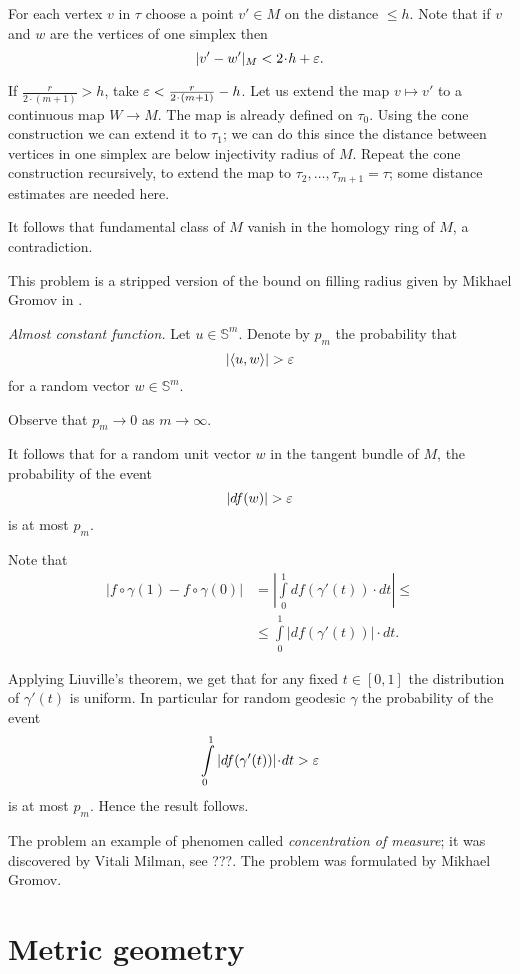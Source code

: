 For each vertex $v$ in $\tau$ 
choose a point $v'\in M$ on the distance $\le h$.
Note that if $v$ and $w$ are the vertices of one simplex then
\[|v'-w'|_M<2\cdot h+\eps.\]

If $\tfrac{r}{2\cdot(m+1)}>h$, take $\eps<\tfrac{r}{2\cdot(m+1)}-h$.
Let us extend the map $v\mapsto v'$ 
to a continuous 
map $W\to M$.
The map is already defined on $\tau_0$.
Using the cone construction we can extend it to $\tau_1$;
we can do this since the distance between vertices in one simplex are below injectivity radius of $M$.
Repeat the cone construction recursively, to extend the map to $\tau_2,\dots,\tau_{m+1}=\tau$;
some distance estimates are needed here.

It follows that fundamental class of $M$ vanish in the homology ring of $M$, 
a contradiction.  

This problem is a stripped version of the bound on filling radius given by Mikhael Gromov in \cite{gromov-filling}.  

\textit{Almost constant function.}
Let $u\in\mathbb{S}^m$.
Denote by $p_m$ 
the probability that 
\[|\langle u,w\rangle|>\eps\]
for a random vector $w\in \mathbb{S}^m$.

Observe that $p_m\to 0$ as $m\to\infty$.

It follows that for a random unit vector $w$ in the tangent bundle of $M$,
the probability of the event
\[|df(w)|>\eps\]
is at most $p_m$.

Note that 
\begin{align*}
|f\circ \gamma(1)-f\circ\gamma(0)|
&=
\left|\int\limits_0^1df(\gamma'(t))\cdot dt\right|\le \\
&\le \int\limits_0^1\left|df(\gamma'(t))\right|\cdot dt.
\end{align*}

Applying Liuville's theorem, we get that for any fixed $t\in[0,1]$
the distribution of $\gamma'(t)$ is uniform.
In particular for random geodesic $\gamma$
the probability of the event
\[\int\limits_0^1|df(\gamma'(t))|\cdot dt>\eps\]
is at most $p_m$.
Hence the result follows.

The problem an example of phenomen called \emph{concentration of measure}; 
it was discovered by Vitali Milman, see ???.
The problem was formulated by Mikhael Gromov. 


\section*{Metric geometry}



